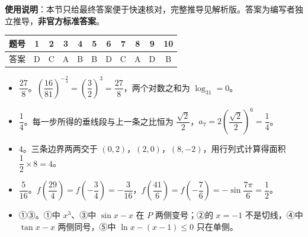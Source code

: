 
\begin{gknotice}
\textbf{使用说明}：本节只给最终答案便于快速核对，完整推导见解析版。答案为编写者独立推导，\textbf{非官方标准答案}。
\end{gknotice}

\begin{center}\begin{tabular}{ccccccccccc}
\toprule
题号 & 1 & 2 & 3 & 4 & 5 & 6 & 7 & 8 & 9 & 10 \\
\midrule
答案 & D & C & A & B & B & D & C & A & D & B \\
\bottomrule
\end{tabular}\end{center}

\begin{itemize}[leftmargin=2.6em]
  \item[\textbf{11.}] $\dfrac{27}8$。$\left(\dfrac{16}{81}\right)^{-\frac34}=\left(\dfrac32\right)^3=\dfrac{27}8$，两个对数之和为 $\log_31=0$。
  \item[\textbf{12.}] $\dfrac14$。每一步所得的垂线段与上一条之比恒为 $\dfrac{\sqrt2}2$，$a_7=2\left(\dfrac{\sqrt2}2\right)^6=\dfrac14$。
  \item[\textbf{13.}] $4$。三条边界两两交于 $(0,2)$，$(2,0)$，$(8,-2)$，用行列式计算得面积 $\dfrac12\times8=4$。
  \item[\textbf{14.}] $\dfrac5{16}$。$f\left(\dfrac{29}4\right)=f\left(-\dfrac34\right)=-\dfrac3{16}$，$f\left(\dfrac{41}6\right)=f\left(-\dfrac76\right)=-\sin\dfrac{7\pi}6=\dfrac12$。
  \item[\textbf{15.}] ①③。①中 $x^3$、③中 $\sin x-x$ 在 $P$ 两侧变号；②的 $x=-1$ 不是切线，④中 $\tan x-x$ 两侧同号，⑤中 $\ln x-(x-1)\leqslant0$ 只在单侧。
\end{itemize}

